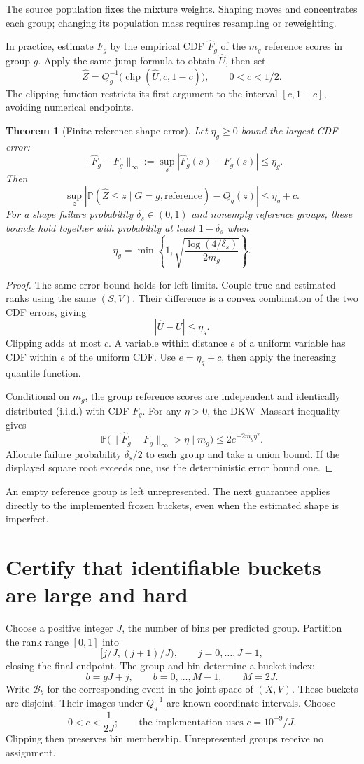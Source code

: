 \documentclass[10pt,letterpaper]{article}
\newtheorem{theorem}{Theorem}
\newcommand{\Prb}{\mathbb P}
\newcommand{\clip}{\operatorname{clip}}
\begin{document}
The source population fixes the mixture weights. Shaping moves and concentrates each group; changing its population mass requires resampling or reweighting.

In practice, estimate $F_g$ by the empirical CDF $\widehat F_g$ of the $m_g$ reference scores in group $g$. Apply the same jump formula to obtain $\widehat U$, then set
\[
 \widehat Z=Q_g^{-1}\bigl(\clip(\widehat U,c,1-c)\bigr),\qquad 0<c<1/2.
\]
The clipping function restricts its first argument to the interval $[c,1-c]$, avoiding numerical endpoints.
\begin{theorem}[Finite-reference shape error]\label{thm:reference}
Let $\eta_g\ge0$ bound the largest CDF error:
\[
 \|\widehat F_g-F_g\|_\infty
 :=\sup_s|\widehat F_g(s)-F_g(s)|\le\eta_g.
\]
Then
\begin{equation}\label{eq:cdferror}
 \sup_z|\Prb(\widehat Z\le z\mid G=g,\text{reference})-Q_g(z)|\le\eta_g+c.
\end{equation}
For a shape failure probability $\delta_s\in(0,1)$ and nonempty reference groups, these bounds hold together with probability at least $1-\delta_s$ when
\[
\eta_g=\min\left\{1,\sqrt{\frac{\log(4/\delta_s)}{2m_g}}\right\}.
\]
\end{theorem}
\begin{proof}
The same error bound holds for left limits. Couple true and estimated ranks using the same $(S,V)$. Their difference is a convex combination of the two CDF errors, giving
\[
 |\widehat U-U|\le\eta_g.
\]
Clipping adds at most $c$. A variable within distance $e$ of a uniform variable has CDF within $e$ of the uniform CDF. Use $e=\eta_g+c$, then apply the increasing quantile function.

Conditional on $m_g$, the group reference scores are independent and identically distributed (i.i.d.) with CDF $F_g$. For any $\eta>0$, the DKW--Massart inequality~\cite{massart} gives
\[
 \Prb\bigl(\|\widehat F_g-F_g\|_\infty>\eta\mid m_g\bigr)
 \le2e^{-2m_g\eta^2}.
\]
Allocate failure probability $\delta_s/2$ to each group and take a union bound. If the displayed square root exceeds one, use the deterministic error bound one.
\end{proof}
An empty reference group is left unrepresented. The next guarantee applies directly to the implemented frozen buckets, even when the estimated shape is imperfect.

\section{Certify that identifiable buckets are large and hard}
Choose a positive integer $J$, the number of bins per predicted group. Partition the rank range $[0,1]$ into
\[
 [j/J,(j+1)/J),\qquad j=0,\ldots,J-1,
\]
closing the final endpoint. The group and bin determine a bucket index:
\[
 b=gJ+j,\qquad b=0,\ldots,M-1,\qquad M=2J.
\]
Write $\mathcal B_b$ for the corresponding event in the joint space of $(X,V)$. These buckets are disjoint. Their images under $Q_g^{-1}$ are known coordinate intervals. Choose
\[
 0<c<\frac1{2J};\qquad\text{the implementation uses }c=10^{-9}/J.
\]
Clipping then preserves bin membership. Unrepresented groups receive no assignment.
\end{document}
